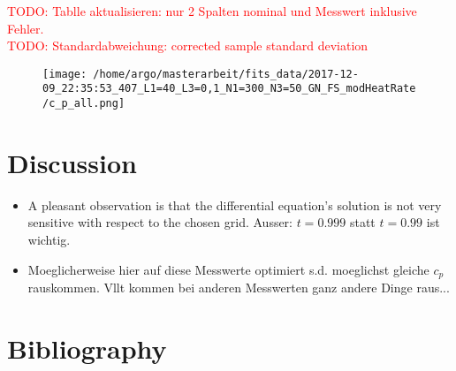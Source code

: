 \documentclass{scrartcl}[12pt, halfparskip]
\numberwithin{equation}{section}
\numberwithin{figure}{section}
\numberwithin{table}{section}
\newcommand{\todo}[1]{\textcolor{red}{TODO: #1}}
\begin{document}
\todo{Tablle aktualisieren: nur 2 Spalten nominal und Messwert inklusive Fehler.} \\
\todo{Standardabweichung: corrected sample standard deviation}


\begin{figure}[H]
	\centering
	\texttt{[image: /home/argo/masterarbeit/fits\_data/2017-12-09\_22:35:53\_407\_L1=40\_L3=0,1\_N1=300\_N3=50\_GN\_FS\_modHeatRate/c\_p\_all.png]}
	\caption{}
	\label{fig:FS_all_c_p_modHeatRate}
\end{figure}



\section{Discussion}

\begin{itemize}
	\item A pleasant observation is that the differential equation's solution is not very sensitive with respect to the chosen grid.  Ausser: $t=0.999$ statt $t=0.99$ ist wichtig.
	\item Moeglicherweise hier auf diese Messwerte optimiert s.d. moeglichst gleiche $c_p$ rauskommen. Vllt kommen bei anderen Messwerten ganz andere Dinge raus...
\end{itemize}


\section{Bibliography}
\end{document}

